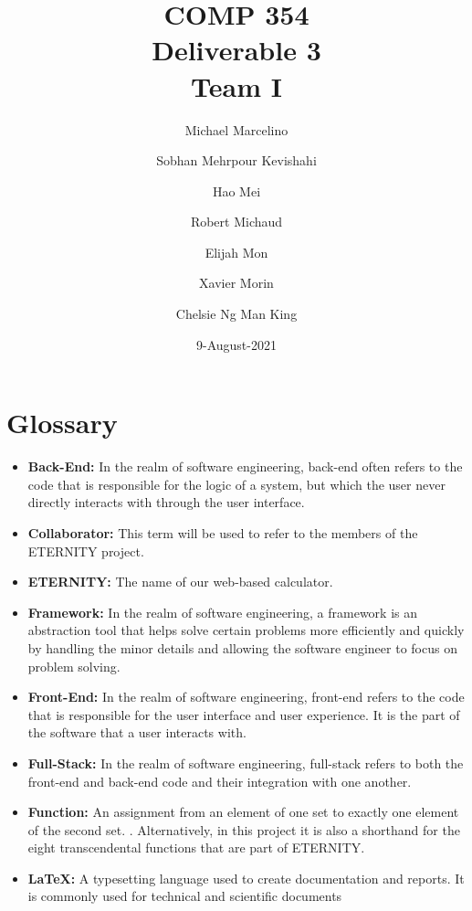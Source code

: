 \documentclass[11pt,onside]{report}
\title{\blue COMP 354 \\
\blueb Deliverable 3 \\ \blue Team I}
\author{
  Michael Marcelino \and
  Sobhan Mehrpour Kevishahi \and
  Hao Mei \and 
  Robert Michaud \and
  Elijah Mon \and
  Xavier Morin \and
  Chelsie Ng Man King}
\date{9-August-2021} %
\begin{document}
\maketitle
\tableofcontents{}
\newpage
\section{Glossary}

\begin{itemize}
    
    \item \textbf{Back-End:} In the realm of software engineering, back-end often refers to the code that is responsible for the logic of a system, but which the user never directly interacts with through the user interface. \cite{sonmez_2017}
    
    \item \textbf{Collaborator:} This term will be used to refer to the members of the ETERNITY project.
    
    \item \textbf{ETERNITY:} The name of our web-based calculator. 
    
    \item \textbf{Framework:} In the realm of software engineering, a framework is an abstraction tool that helps solve certain problems more efficiently and quickly by handling the minor details and allowing the software engineer to focus on problem solving. \cite{framework}
    
    \item \textbf{Front-End:} In the realm of software engineering, front-end refers to the code that is responsible for the user interface and user experience. It is the part of the software that a user interacts with. \cite{naor_2021}
    
    \item \textbf{Full-Stack:} In the realm of software engineering, full-stack refers to both the front-end and back-end code and their integration with one another.

    \item \textbf{Function:} An assignment from an element of one set to exactly one element of the second set. \cite{function}. Alternatively, in this project it is also a shorthand for the eight transcendental functions that are part of ETERNITY.
    
    \item \textbf{\LaTeX:} A typesetting language used to create documentation and reports. It is commonly used for technical and scientific documents \cite{latex}
    

\end{itemize}
\end{document}
